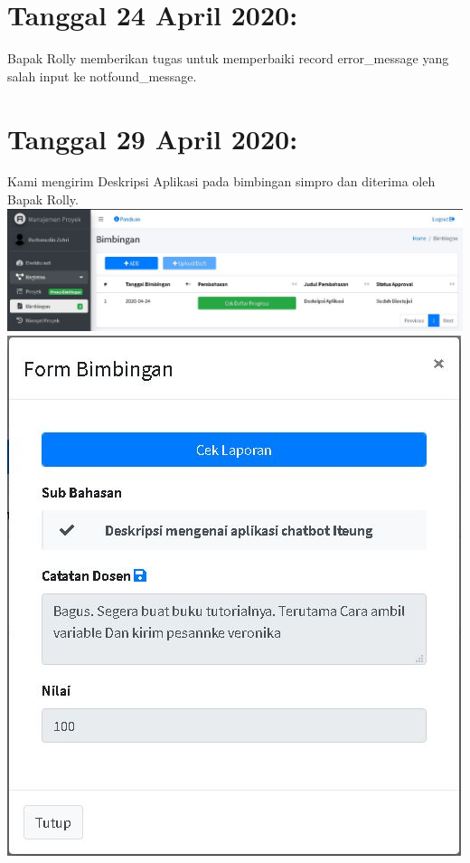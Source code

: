 \documentclass{article}
\begin{document}
\section{Tanggal 24 April 2020:}
Bapak Rolly memberikan tugas untuk memperbaiki record error\_message yang salah input ke notfound\_message.
	\newline
	\newline

\section{Tanggal 29 April 2020:}
Kami mengirim Deskripsi Aplikasi pada bimbingan simpro dan diterima oleh Bapak Rolly.
	\newline
	\includegraphics[scale=0.3]{3a.jpg}
	\newline
	\newline
	\includegraphics[scale=0.5]{3b.jpg}
	\newline
\end{document}
